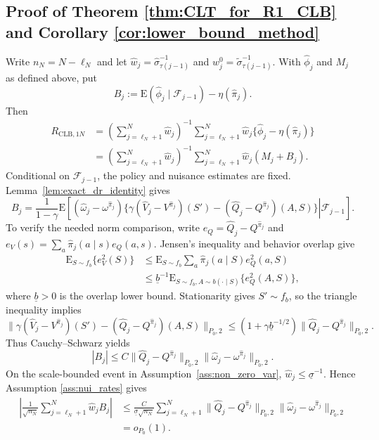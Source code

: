 \documentclass[12pt]{article}
\theoremstyle{remark}\newtheorem{remark}[theorem]{Remark}\theoremstyle{plain}
\newcommand{\E}{\mathrm{E}}
\begin{document}
\subsection{Proof of Theorem \ref{thm:CLT_for_R1_CLB} and
Corollary \ref{cor:lower_bound_method}}\label{sec:lower_bound_proofs_new}

Write $n_N=N-\ell_N$ and let
$\widehat w_j=\widehat\sigma_{\tau(j-1)}^{-1}$ and
$w_j^0=\widetilde\sigma_{\tau(j-1)}^{-1}$.  With
$\widehat\phi_j$ and $M_j$ as defined above, put
\[
    B_j:=\E(\widehat\phi_j\mid\mathcal F_{j-1})
    -\eta(\widehat\pi_j).
\]
Then
\[
    \begin{aligned}
    R_{\mathrm{CLB},1N}
    &=
    \left(\sum_{j=\ell_N+1}^N\widehat w_j\right)^{-1}
    \sum_{j=\ell_N+1}^N
    \widehat w_j\{\widehat\phi_j-\eta(\widehat\pi_j)\}\\
    &=
    \left(\sum_{j=\ell_N+1}^N\widehat w_j\right)^{-1}
    \sum_{j=\ell_N+1}^N\widehat w_j(M_j+B_j).
    \end{aligned}
\]
Conditional on $\mathcal F_{j-1}$, the policy and nuisance estimates
are fixed.  Lemma~\ref{lem:exact_dr_identity} gives
\[
    B_j=
    \frac1{1-\gamma}
    \E\!\left[
    \left.
    (\widehat\omega_j-\omega^{\widehat\pi_j})
    \{\gamma(\widehat V_j-V^{\widehat\pi_j})(S')
    -(\widehat Q_j-Q^{\widehat\pi_j})(A,S)\}
    \right|\mathcal F_{j-1}\right].
\]
To verify the needed norm comparison, write
$e_Q=\widehat Q_j-Q^{\widehat\pi_j}$ and
$e_V(s)=\sum_a\widehat\pi_j(a\mid s)e_Q(a,s)$.
Jensen's inequality and behavior overlap give
\[
    \begin{aligned}
    \E_{S\sim f_b}\{e_V^2(S)\}
    &\leq
    \E_{S\sim f_b}
    \sum_a\widehat\pi_j(a\mid S)e_Q^2(a,S)\\
    &\leq
    \underline b^{-1}
    \E_{S\sim f_b,A\sim b(\cdot\mid S)}
    \{e_Q^2(A,S)\},
    \end{aligned}
\]
where $\underline b>0$ is the overlap lower bound.  Stationarity
gives $S'\sim f_b$, so the triangle inequality implies
\[
    \|\gamma(\widehat V_j-V^{\widehat\pi_j})(S')
      -(\widehat Q_j-Q^{\widehat\pi_j})(A,S)\|_{P_0,2}
    \leq(1+\gamma\underline b^{-1/2})
    \|\widehat Q_j-Q^{\widehat\pi_j}\|_{P_0,2}.
\]
Thus Cauchy--Schwarz yields
\[
    |B_j|
    \leq C
    \|\widehat Q_j-Q^{\widehat\pi_j}\|_{P_0,2}
    \|\widehat\omega_j-\omega^{\widehat\pi_j}\|_{P_0,2}.
\]
On the scale-bounded event in Assumption~\ref{ass:non_zero_var},
$\widehat w_j\leq\underline\sigma^{-1}$.  Hence Assumption
\ref{ass:nui_rates} gives
\[
    \begin{aligned}
    \left|
    \frac1{\sqrt{n_N}}
    \sum_{j=\ell_N+1}^N\widehat w_jB_j
    \right|
    &\leq
    \frac{C}{\underline\sigma\sqrt{n_N}}
    \sum_{j=\ell_N+1}^N
    \|\widehat Q_j-Q^{\widehat\pi_j}\|_{P_0,2}
    \|\widehat\omega_j-\omega^{\widehat\pi_j}\|_{P_0,2}\\
    &=o_{P_0}(1).
    \end{aligned}
\]
\end{document}
